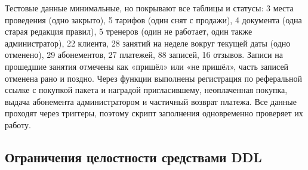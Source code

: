 \documentclass[14pt,a4paper]{extarticle}
\renewcommand{\_}{\textunderscore\allowbreak}
\begin{document}
Тестовые данные минимальные, но покрывают все таблицы и статусы: 3 места проведения (одно закрыто), 5 тарифов (один снят с продажи), 4 документа (одна старая редакция правил), 5 тренеров (один не работает, один также администратор), 22 клиента, 28 занятий на неделе вокруг текущей даты (одно отменено), 29 абонементов, 27 платежей, 88 записей, 16 отзывов. Записи на прошедшие занятия отмечены как «пришёл» или «не пришёл», часть записей отменена рано и поздно. Через функции выполнены регистрация по реферальной ссылке с покупкой пакета и наградой пригласившему, неоплаченная покупка, выдача абонемента администратором и частичный возврат платежа. Все данные проходят через триггеры, поэтому скрипт заполнения одновременно проверяет их работу.

\subsection{Ограничения целостности средствами DDL}
\end{document}
